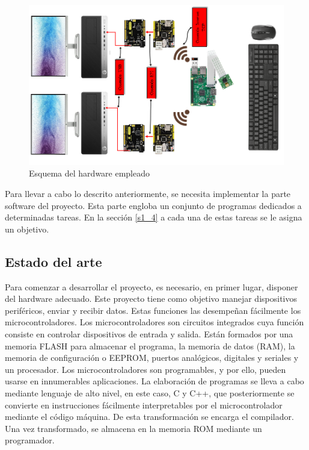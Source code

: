 \begin{figure}
\centering
\includegraphics[scale = 0.6, angle=-90]{capitulo_01/figuras_dir/esquemahardware.jpg}
\caption{Esquema del hardware empleado}
\label{fig:esquemahardware}
\end{figure}


Para llevar a cabo lo descrito anteriormente, se necesita implementar la parte software del proyecto. Esta parte engloba un conjunto de programas dedicados a determinadas tareas. En la sección \ref{s1_4} a cada una de estas tareas se le asigna un objetivo.

\subsection{Estado del arte} \label{s1_3_1}

Para comenzar a desarrollar el proyecto, es necesario, en primer lugar, disponer del hardware adecuado. Este proyecto tiene como objetivo manejar dispositivos periféricos, enviar y recibir datos. Estas funciones las desempeñan fácilmente los microcontroladores.
Los microcontroladores son circuitos integrados cuya función consiste en controlar dispositivos de entrada y salida. Están formados por una memoria FLASH para almacenar el programa, la memoria de datos (RAM), la memoria de configuración o EEPROM, puertos analógicos, digitales y seriales y un procesador. Los microcontroladores son programables, y por ello, pueden usarse en innumerables aplicaciones. La elaboración de programas se lleva a cabo mediante lenguaje de alto nivel, en este caso, C y C++, que posteriormente se convierte en instrucciones fácilmente interpretables por el microcontrolador mediante el código máquina. De esta transformación se encarga el compilador. Una vez transformado, se almacena en la memoria ROM mediante un programador.

